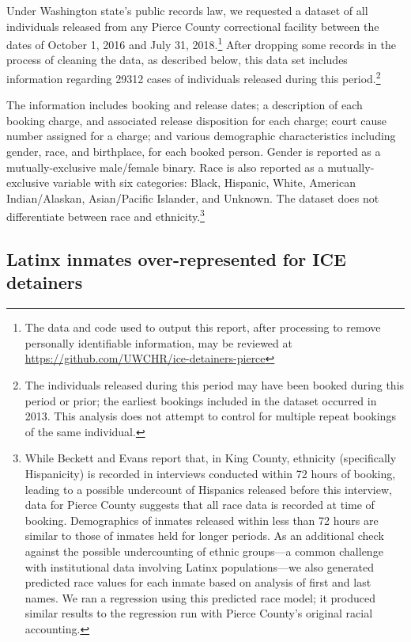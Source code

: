 \documentclass[12pt]{report}\usepackage[]{graphicx}\usepackage[]{color}
\begin{document}
Under Washington state's public records law, we requested a dataset of all individuals released from any Pierce County correctional facility between the dates of October 1, 2016 and July 31, 2018.\footnote{The data and code used to output this report, after processing to remove personally identifiable information, may be reviewed at \url{https://github.com/UWCHR/ice-detainers-pierce}} After dropping some records in the process of cleaning the data, as described below, this data set includes information regarding 29312 cases of individuals released during this period.\footnote{The individuals released during this period may have been booked during this period or prior; the earliest bookings included in the dataset occurred in 2013. This analysis does not attempt to control for multiple repeat bookings of the same individual.}

The information includes booking and release dates; a description of each booking charge, and associated release disposition for each charge; court cause number assigned for a charge; and various demographic characteristics including gender, race, and birthplace, for each booked person. Gender is reported as a mutually-exclusive male/female binary. Race is also reported as a mutually-exclusive variable with six categories: Black, Hispanic, White, American Indian/Alaskan, Asian/Pacific Islander, and Unknown. The dataset does not differentiate between race and ethnicity.\footnote{While Beckett and Evans report that, in King County, ethnicity (specifically Hispanicity) is recorded in interviews conducted within 72 hours of booking, leading to a possible undercount of Hispanics released before this interview, data for Pierce County suggests that all race data is recorded at time of booking. Demographics of inmates released within less than 72 hours are similar to those of inmates held for longer periods. As an additional check against the possible undercounting of ethnic groups---a common challenge with institutional data involving Latinx populations---we also generated predicted race values for each inmate based on analysis of first and last names. We ran a regression using this predicted race model; it produced similar results to the regression run with Pierce County's original racial accounting.}

\subsection*{Latinx inmates over-represented for ICE detainers}
\end{document}
